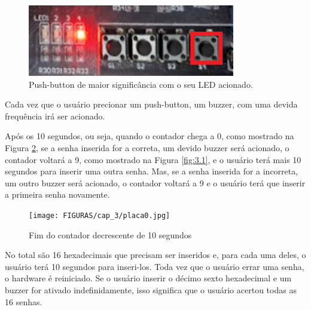 \begin{figure}[H]
	\centering
	\includegraphics[width=1\columnwidth]{FIGURAS/cap_3/pb4.png}
	\caption{Push-button de maior significância com o seu LED acionado.}
        \label{fig:3.6}
\end{figure}


Cada vez que o usuário precionar um push-button, um buzzer, com uma devida frequência irá ser acionado. 

Após os 10 segundos, ou seja, quando o contador chega a 0, como mostrado na Figura \ref{fig:3.7}, se a senha inserida for a correta, um devido buzzer será acionado, o contador voltará a 9, como mostrado na Figura \ref{fig:3.1}, e o usuário terá mais 10 segundos para inserir uma outra senha. Mas, se a senha inserida for a incorreta, um outro buzzer será acionado, o contador voltará a 9 e o usuário terá que inserir a primeira senha novamente.

\begin{figure}[H]
	\centering
	\texttt{[image: FIGURAS/cap\_3/placa0.jpg]}
	\caption{Fim do contador decrescente de 10 segundos}
        \label{fig:3.7}
\end{figure}

No total são 16 hexadecimais que precisam ser inseridos e, para cada uma deles, o usuário terá 10 segundos para inseri-los. Toda vez que o usuário errar uma senha, o hardware é reiniciado. Se o usuário inserir o décimo sexto hexadecimal e um buzzer for ativado indefinidamente, isso significa que o usuário acertou todas as 16 senhas. 

